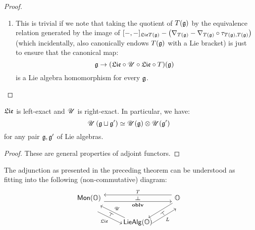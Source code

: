 \begin{proof}
\begin{enumerate}
                        \item This is trivial if we note that taking the quotient of $T(\mathfrak{g})$ by the equivalence relation generated by the image of $[-,-]_{\mathfrak{Lie} T(\mathfrak{g})} - \left(\nabla_{T(\mathfrak{g})} - \nabla_{T(\mathfrak{g})} \circ \tau_{T(\mathfrak{g}), T(\mathfrak{g})}\right)$ (which incidentally, also canonically endows $T(\mathfrak{g})$ with a Lie bracket) is just to ensure that the canonical map:
                            $$\mathfrak{g} \to (\mathfrak{Lie} \circ \mathscr{U} \circ \mathfrak{Lie} \circ T)(\mathfrak{g})$$
                        is a Lie algebra homomorphism for every $\mathfrak{g}$.
                    \end{enumerate}
                \end{proof}
            \begin{corollary}
                $\mathfrak{Lie}$ is left-exact and $\mathscr{U}$ is right-exact. In particular, we have:
                    $$\U\left(\g \sqcup \g'\right) \cong \U(\g) \tensor \U(\g')$$
                for any pair $\mathfrak{g}, \mathfrak{g}'$ of Lie algebras. 
            \end{corollary}
                \begin{proof}
                    These are general properties of adjoint functors.
                \end{proof}
            \begin{remark}
                The adjunction as presented in the preceding theorem can be understood as fitting into the following (non-commutative) diagram:
                    $$
                        \begin{tikzcd}
                        	{\Mon(\O)} & {} & {\O} \\
                        	& {\Lie\Alg(\O)}
                        	\arrow["{\oblv}"{name=0, swap}, from=1-1, to=1-3, shift right=2]
                        	\arrow["{T}"{name=1, swap}, from=1-3, to=1-1, shift right=2]
                        	\arrow["{L}"{name=2, swap}, from=2-2, to=1-3, shift right=5]
                        	\arrow[""{name=3, inner sep=0}, from=1-3, to=2-2, shift left=1]
                        	\arrow["{\U}"{name=4, swap}, from=2-2, to=1-1, shift left=1]
                        	\arrow["{\frakLie}"{name=5, swap}, from=1-1, to=2-2, shift right=5]
                        	\arrow["\dashv"{rotate=-90}, from=1, to=0, phantom]
                        	\arrow["\dashv"{rotate=61}, from=5, to=4, phantom]
                        	\arrow["\dashv"{rotate=129}, from=2, to=3, phantom]
                        \end{tikzcd}
                    $$
            \end{remark}
